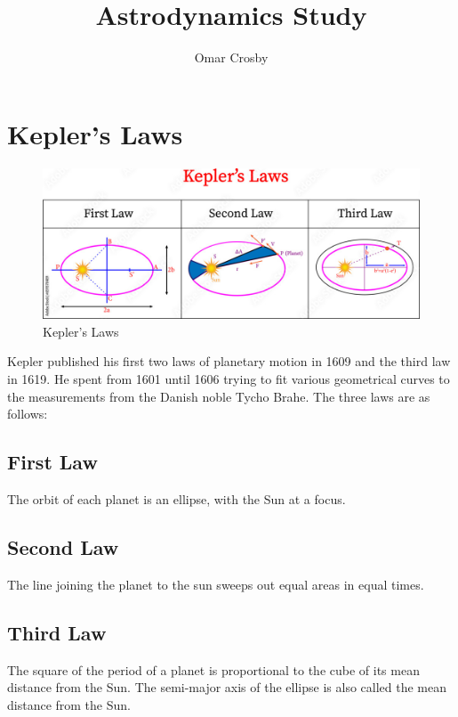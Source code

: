\documentclass[11pt]{article}
\title{Astrodynamics Study}
\author{Omar Crosby}
\begin{document}
    \maketitle

    \section{Kepler's Laws}

    \begin{figure}[h]
        \centering
        \includegraphics[width=\textwidth]{images/keplers_laws.jpeg}
        \caption{Kepler's Laws}
        \label{fig:keplers_laws}
    \end{figure}

    Kepler published his first two laws of planetary motion in 1609 and the third law in 1619.  He spent from 1601
    until 1606 trying to fit various geometrical curves to the measurements from the Danish noble Tycho Brahe. The
    three laws are as follows:

    \subsection{First Law}
    The orbit of each planet is an ellipse, with the Sun at a focus.

    \subsection{Second Law}
    The line joining the planet to the sun sweeps out equal areas in equal times.

    \subsection{Third Law}
    The square of the period of a planet is proportional to the cube of its mean distance from the Sun.  The semi-major axis of the ellipse is also called the mean distance from the Sun.
\end{document}
